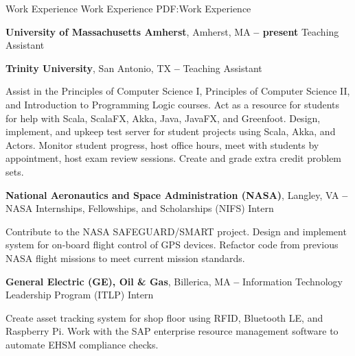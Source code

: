 \Section
{Work Experience}
{Work Experience}
{PDF:Work Experience}

\Entry
\textbf{University of Massachusetts Amherst},
Amherst, MA 
\dotfill
\textbf{ -- present}
\Gap
Teaching Assistant
\begin{Detail}
    \SubBulletItem
\end{Detail}

\BigGap
\Entry
\textbf{Trinity University},
San Antonio, TX
\dotfill
\textbf{ -- }
\Gap
Teaching Assistant
\begin{Detail}
    \SubBulletItem
    Assist in the Principles of Computer Science I, Principles of Computer Science II, and Introduction to Programming Logic courses.
    \SubBulletItem
    Act as a resource for students for help with Scala, ScalaFX, Akka, Java, JavaFX, and Greenfoot.
    \SubBulletItem
    Design, implement, and upkeep test server for student projects using Scala, Akka, and Actors.
    \SubBulletItem
    Monitor student progress, host office hours, meet with students by appointment, host exam review sessions.
    \SubBulletItem
    Create and grade extra credit problem sets.
\end{Detail}

\BigGap
\Entry
\textbf{National Aeronautics and Space Administration (NASA)},
Langley, VA
\dotfill
\textbf{ -- }
\Gap
NASA Internships, Fellowships, and Scholarships (NIFS) Intern
\begin{Detail}
    \SubBulletItem
    Contribute to the NASA SAFEGUARD/SMART project.
    \SubBulletItem
    Design and implement system for on-board flight control of GPS devices.
    \SubBulletItem
    Refactor code from previous NASA flight missions to meet current mission standards.
\end{Detail}

\Entry
\BigGap
\textbf{General Electric (GE), Oil \& Gas},
Billerica, MA
\dotfill
\textbf{ --
}
\Gap
Information Technology Leadership Program (ITLP) Intern
\begin{Detail}
    \SubBulletItem
    Create asset tracking system for shop floor using RFID, Bluetooth LE, and Raspberry Pi.
    \SubBulletItem
    Work with the SAP enterprise resource management software to automate EHSM compliance checks.
\end{Detail}